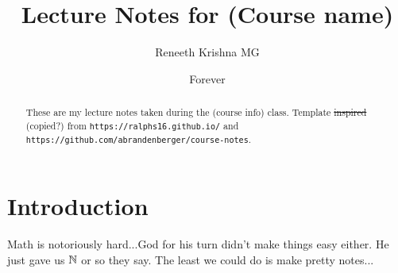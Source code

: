 \documentclass{tufte-handout}
\title{Lecture Notes for (Course name)}
\author[Reneeth Krishna MG]{Reneeth Krishna MG}
\date{Forever}
\begin{document}
\maketitle

\begin{abstract}
These are my lecture notes taken during the (course info) class. Template \st{inspired} (copied?) from \verb|https://ralphs16.github.io/| and \verb|https://github.com/abrandenberger/course-notes|.
\end{abstract}

\tableofcontents
\newpage

\section{Introduction}
Math is notoriously hard...God for his turn didn't make things easy either. He just gave us $\mathbb{N}$ or so they say. The least we could do is make pretty notes...
\end{document}
